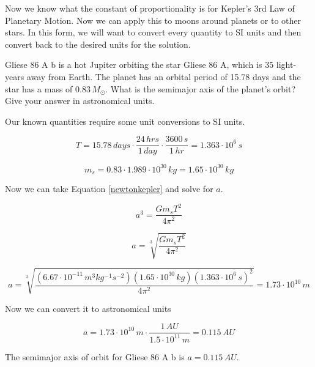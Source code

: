 \documentclass[12pt]{book}
\begin{document}
Now we know what the constant of proportionality is for Kepler's 3rd Law of Planetary Motion. Now we can apply this to moons around planets or to other stars. In this form, we will want to convert every quantity to SI units and then convert back to the desired units for the solution.

\begin{exampleblock}

Gliese 86 A b is a hot Jupiter orbiting the star Gliese 86 A, which is 35 light-years away from Earth. The planet has an orbital period of 15.78 days and the star has a mass of $0.83 \, M_{\odot}$. What is the semimajor axis of the planet's orbit? Give your answer in astronomical units.

\hspace{10pt}

Our known quantities require some unit conversions to SI units.

\begin{equation}
T = 15.78 \, days \cdot \frac{24 \, hrs}{1 \, day} \cdot \frac{3600 \, s}{1 \, hr} = 1.363 \cdot 10^6 \, s
\end{equation}

\begin{equation}
m_s = 0.83 \cdot 1.989 \cdot 10^{30} \, kg = 1.65 \cdot 10^{30} \, kg
\end{equation}


Now we can take Equation \ref{newtonkepler} and solve for $a$.

\begin{equation}
a^3 = \frac{G m_s T^2}{4 \pi^2}
\end{equation}

\begin{equation}
a = \sqrt[3]{\frac{G m_s T^2}{4 \pi^2}}
\end{equation}

\begin{equation}
a = \sqrt[3]{\frac{(6.67 \cdot 10^{-11} \, m^3 kg^{-1} s^{-2}) (1.65 \cdot 10^{30} \, kg) (1.363 \cdot 10^6 \, s)^2}{4 \pi^2}} = 1.73 \cdot 10^{10} \, m
\end{equation}

Now we can convert it to astronomical units

\begin{equation}
a = 1.73 \cdot 10^{10} \, m \cdot \frac{1 \, AU}{1.5 \cdot 10^{11} \, m} = 0.115 \, AU
\end{equation}

The semimajor axis of orbit for Gliese 86 A b is $a = 0.115 \, AU$.

\end{exampleblock}
\end{document}
